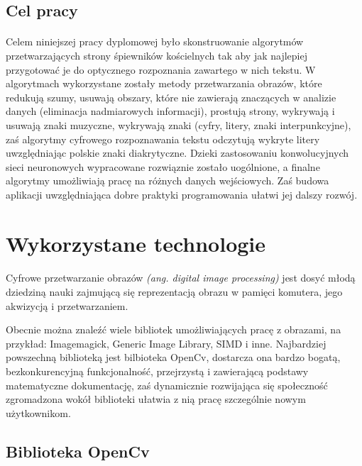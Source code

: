 \documentclass[a4paper,12pt]{article}
\begin{document}
		\subsection{Cel pracy}
			\paragraph{\indent}
			 Celem niniejszej pracy dyplomowej było skonstruowanie algorytmów 
				przetwarzających strony śpiewników kościelnych tak aby jak najlepiej przygotować je do optycznego rozpoznania zawartego w nich tekstu. 
				W algorytmach wykorzystane zostały metody przetwarzania obrazów, które redukują szumy, usuwają obszary, które nie zawierają znaczących w analizie danych (eliminacja nadmiarowych informacji), prostują strony, wykrywają i usuwają znaki muzyczne, wykrywają znaki (cyfry, litery, znaki interpunkcyjne), zaś algorytmy cyfrowego rozpoznawania tekstu odczytują wykryte litery uwzględniając polskie znaki diakrytyczne. Dzieki zastosowaniu konwolucyjnych sieci neuronowych wypracowane rozwiąznie zostało uogólnione, a finalne algorytmy umożliwiają pracę na różnych danych wejściowych. Zaś budowa aplikacji uwzględniająca dobre praktyki programowania ułatwi jej dalszy rozwój. 
	\newpage 

	\section{Wykorzystane technologie}
	    \paragraph{\indent} Cyfrowe przetwarzanie obrazów \textit{(ang. digital image processing)} jest dosyć młodą dziedziną nauki zajmującą się reprezentacją obrazu w pamięci komutera, jego akwizycją i przetwarzaniem. 
        \par Obecnie można znaleźć wiele bibliotek umożliwiających pracę z obrazami, na przykład: Imagemagick, Generic Image Library, SIMD i inne. Najbardziej powszechną biblioteką jest bilbioteka OpenCv, dostarcza ona bardzo bogatą, bezkonkurencyjną funkcjonalność, przejrzystą i zawierającą podstawy matematyczne dokumentację, zaś dynamicznie rozwijająca się społeczność zgromadzona wokół biblioteki ułatwia z nią pracę szczególnie nowym użytkownikom.
	    
		\subsection{Biblioteka OpenCv}
\end{document}
